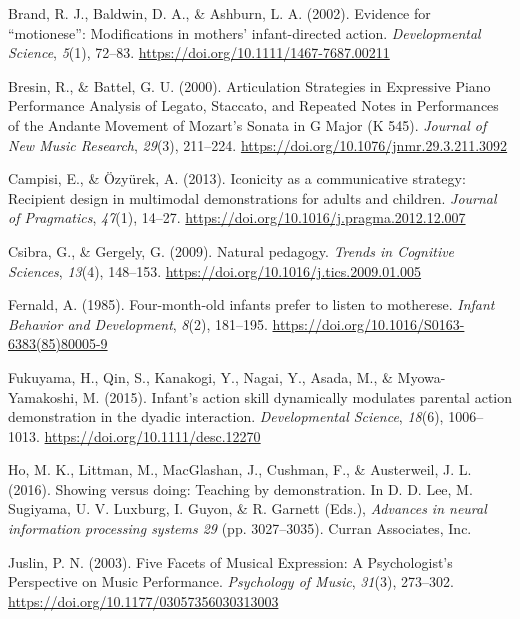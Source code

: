 \documentclass[
  english,
  man,floatsintext]{apa6}
\newlength{\cslhangindent}
\newenvironment{cslreferences}%
  {\setlength{\parindent}{0pt}%
  \everypar{\setlength{\hangindent}{\cslhangindent}}\ignorespaces}%
  {\par}
\begin{document}
\hypertarget{refs}{}
\begin{cslreferences}
\leavevmode\hypertarget{ref-brand_2002}{}%
Brand, R. J., Baldwin, D. A., \& Ashburn, L. A. (2002). Evidence for ``motionese'': Modifications in mothers' infant-directed action. \emph{Developmental Science}, \emph{5}(1), 72--83. \url{https://doi.org/10.1111/1467-7687.00211}

\leavevmode\hypertarget{ref-bresin_2000}{}%
Bresin, R., \& Battel, G. U. (2000). Articulation Strategies in Expressive Piano Performance Analysis of Legato, Staccato, and Repeated Notes in Performances of the Andante Movement of Mozart's Sonata in G Major (K 545). \emph{Journal of New Music Research}, \emph{29}(3), 211--224. \url{https://doi.org/10.1076/jnmr.29.3.211.3092}

\leavevmode\hypertarget{ref-campisi_2013}{}%
Campisi, E., \& Özyürek, A. (2013). Iconicity as a communicative strategy: Recipient design in multimodal demonstrations for adults and children. \emph{Journal of Pragmatics}, \emph{47}(1), 14--27. \url{https://doi.org/10.1016/j.pragma.2012.12.007}

\leavevmode\hypertarget{ref-csibra_2009}{}%
Csibra, G., \& Gergely, G. (2009). Natural pedagogy. \emph{Trends in Cognitive Sciences}, \emph{13}(4), 148--153. \url{https://doi.org/10.1016/j.tics.2009.01.005}

\leavevmode\hypertarget{ref-fernald_1985}{}%
Fernald, A. (1985). Four-month-old infants prefer to listen to motherese. \emph{Infant Behavior and Development}, \emph{8}(2), 181--195. \url{https://doi.org/10.1016/S0163-6383(85)80005-9}

\leavevmode\hypertarget{ref-fukuyama_2015}{}%
Fukuyama, H., Qin, S., Kanakogi, Y., Nagai, Y., Asada, M., \& Myowa-Yamakoshi, M. (2015). Infant's action skill dynamically modulates parental action demonstration in the dyadic interaction. \emph{Developmental Science}, \emph{18}(6), 1006--1013. \url{https://doi.org/10.1111/desc.12270}

\leavevmode\hypertarget{ref-NIPS2016_6413}{}%
Ho, M. K., Littman, M., MacGlashan, J., Cushman, F., \& Austerweil, J. L. (2016). Showing versus doing: Teaching by demonstration. In D. D. Lee, M. Sugiyama, U. V. Luxburg, I. Guyon, \& R. Garnett (Eds.), \emph{Advances in neural information processing systems 29} (pp. 3027--3035). Curran Associates, Inc.

\leavevmode\hypertarget{ref-juslin_2003}{}%
Juslin, P. N. (2003). Five Facets of Musical Expression: A Psychologist's Perspective on Music Performance. \emph{Psychology of Music}, \emph{31}(3), 273--302. \url{https://doi.org/10.1177/03057356030313003}


\end{cslreferences}
\end{document}
